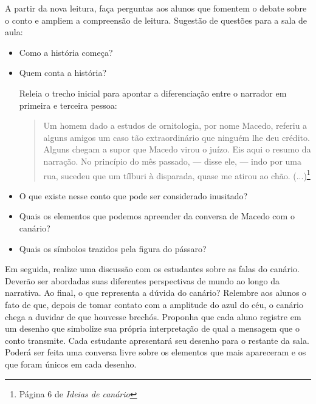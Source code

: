 \documentclass[11pt]{extarticle}
\begin{document}
A partir da nova leitura, faça perguntas aos alunos que fomentem o debate sobre o conto e ampliem a compreensão de leitura.
Sugestão de questões para a sala de aula:

\begin{itemize}

\item Como a história começa? 

\item Quem conta a história?

Releia o trecho inicial para apontar a diferenciação entre o narrador em primeira e terceira pessoa:

\begin{quote}Um homem dado a estudos de ornitologia, por nome Macedo, referiu a alguns amigos um caso tão extraordinário que ninguém lhe deu crédito.
Alguns chegam a supor que Macedo virou o juízo. Eis aqui o resumo da narração.
No princípio do mês passado, — disse ele, — indo por uma rua, sucedeu que um tílburi à disparada, quase me atirou ao chão. (...)\footnote{Página 6 de \textit{Ideias de canário}}\end{quote} 

\item O que existe nesse conto que pode ser considerado inusitado? 

\item Quais os elementos que podemos apreender da conversa de Macedo com o canário?

\item Quais os símbolos trazidos pela figura do pássaro?

\end{itemize}


Em seguida, realize uma discussão com os estudantes sobre as falas do canário. Deverão ser abordadas suas diferentes perspectivas de mundo ao longo da narrativa. Ao final, o que representa a dúvida do canário? Relembre aos alunos o fato de que, depois de tomar contato com a amplitude do azul do céu, o canário chega a duvidar de que houvesse brechós. Proponha que cada aluno registre em um desenho que simbolize sua própria interpretação de qual a mensagem que o conto transmite. Cada estudante apresentará seu desenho para o restante da sala. Poderá ser feita uma conversa livre sobre os elementos que mais apareceram e os que foram únicos em cada desenho.

\end{document}
